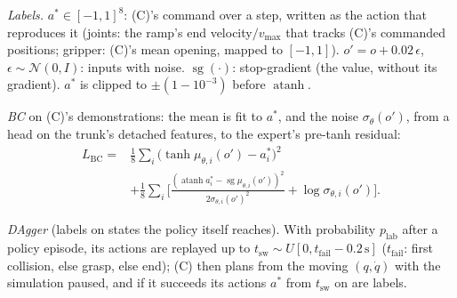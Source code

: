 \documentclass[conference]{IEEEtran}
\newcommand{\sg}{\operatorname{sg}}
\begin{document}
\emph{Labels.} $a^*\in[-1,1]^8$: (C)'s command over a step, written as the action that reproduces it (joints: the
ramp's end velocity$/v_{\max}$ that tracks (C)'s commanded positions; gripper: (C)'s mean opening, mapped to
$[-1,1]$). $o'=o+0.02\,\epsilon$, $\epsilon\sim\mathcal N(0,I)$: inputs with noise. $\sg(\cdot)$: stop-gradient (the
value, without its gradient). $a^*$ is clipped to $\pm(1-10^{-3})$ before $\operatorname{atanh}$.

\emph{BC} on (C)'s demonstrations: the mean is fit to $a^*$, and the noise $\sigma_\theta(o')$, from a head on the
trunk's detached features, to the expert's pre-tanh residual:
\begin{equation}
\begin{aligned}
L_{\text{BC}}={}&\tfrac18\textstyle\sum_i\big(\tanh\mu_{\theta,i}(o')-a^*_i\big)^2\\
&+\tfrac18\textstyle\sum_i\Big[\frac{(\operatorname{atanh}a^*_i-\sg\mu_{\theta,i}(o'))^2}{2\sigma_{\theta,i}(o')^2}
+\log\sigma_{\theta,i}(o')\Big].
\end{aligned}
\end{equation}

\emph{DAgger} (labels on states the policy itself reaches). With probability $p_{\text{lab}}$ after a policy
episode, its actions are replayed up to $t_{\text{sw}}\sim U[0,t_{\text{fail}}-0.2\,\text{s}]$ ($t_{\text{fail}}$:
first collision, else grasp, else end); (C) then plans from the moving $(q,\dot q)$ with the simulation paused, and if
it succeeds its actions $a^*$ from $t_{\text{sw}}$ on are labels.
\end{document}
